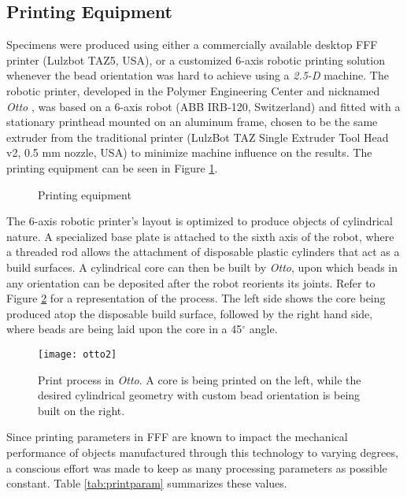 \documentclass[main.tex]{subfiles}
\begin{document}
\subsection{Printing Equipment}
Specimens were produced using either a commercially available desktop FFF printer (Lulzbot TAZ5, USA), or a customized 6-axis robotic printing solution whenever the bead orientation was hard to achieve using a \emph{2.5-D} machine. The robotic printer, developed in the Polymer Engineering Center and nicknamed \emph{Otto} \cite{VanHulle2017}, was based on a 6-axis robot (ABB IRB-120, Switzerland) and fitted with a stationary printhead mounted on an aluminum frame, chosen to be the same extruder from the traditional printer (LulzBot TAZ Single Extruder Tool Head v2, 0.5 mm nozzle, USA) to minimize machine influence on the results. The printing equipment can be seen in Figure \ref{fig:PrintEquip}. 
\begin{figure}[h]
	\center
	\hfill
	\caption{Printing equipment} \label{fig:PrintEquip}
\end{figure}

The 6-axis robotic printer's layout is optimized to produce objects of cylindrical nature. A specialized base plate is attached to the sixth axis of the robot, where a threaded rod allows the attachment of disposable plastic cylinders that act as a build surfaces. A cylindrical core can then be built by \emph{Otto}, upon which beads in any orientation can be deposited after the robot reorients its joints. Refer to Figure \ref{fig:otto2} for a representation of the process. The left side shows the core being produced atop the disposable build surface, followed by the right hand side, where beads are being laid upon the core in a 45$^\circ$ angle.  
\begin{figure}[h]
	\center
	\texttt{[image: otto2]}
	\captionsetup{justification=centering} %
	\caption[Print process in \emph{Otto}]{Print process in \emph{Otto}. A core is being printed on the left, while the desired cylindrical geometry with custom bead orientation is being built on the right.} \label{fig:otto2}
\end{figure}

Since printing parameters in FFF are known to impact the mechanical performance of objects manufactured through this technology to varying degrees, a conscious effort was made to keep as many processing parameters as possible constant. Table \ref{tab:printparam} summarizes these values.
\end{document}
